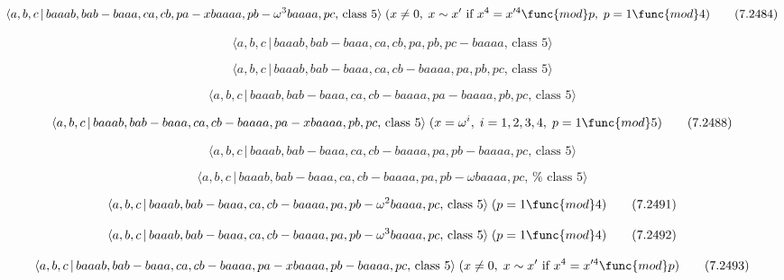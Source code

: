 \documentclass[10pt]{article}
\begin{document}
\begin{equation}
\langle a,b,c\,|\,baaab,bab-baaa,ca,cb,pa-xbaaaa,pb-\omega ^{3}baaaa,pc,\,%
\text{class }5\rangle \;(x\neq 0,\;x\sim x^{\prime }\text{ if }%
x^{4}=x^{\prime 4}\func{mod}p,\;p=1\func{mod}4)  \tag{7.2484}
\end{equation}

\begin{equation}
\langle a,b,c\,|\,baaab,bab-baaa,ca,cb,pa,pb,pc-baaaa,\,\text{class }5\rangle
\tag{7.2485}
\end{equation}

\begin{equation}
\langle a,b,c\,|\,baaab,bab-baaa,ca,cb-baaaa,pa,pb,pc,\,\text{class }5\rangle
\tag{7.2486}
\end{equation}

\begin{equation}
\langle a,b,c\,|\,baaab,bab-baaa,ca,cb-baaaa,pa-baaaa,pb,pc,\,\text{class }%
5\rangle  \tag{7.2487}
\end{equation}

\begin{equation}
\langle a,b,c\,|\,baaab,bab-baaa,ca,cb-baaaa,pa-xbaaaa,pb,pc,\,\text{class }%
5\rangle \;(x=\omega ^{i},\;i=1,2,3,4,\;p=1\func{mod}5)  \tag{7.2488}
\end{equation}

\begin{equation}
\langle a,b,c\,|\,baaab,bab-baaa,ca,cb-baaaa,pa,pb-baaaa,pc,\,\text{class }%
5\rangle  \tag{7.2489}
\end{equation}

\begin{equation}
\langle a,b,c\,|\,baaab,bab-baaa,ca,cb-baaaa,pa,pb-\omega baaaa,pc,\,\text{%
class }5\rangle  \tag{7.2490}
\end{equation}

\begin{equation}
\langle a,b,c\,|\,baaab,bab-baaa,ca,cb-baaaa,pa,pb-\omega ^{2}baaaa,pc,\,%
\text{class }5\rangle \;(p=1\func{mod}4)  \tag{7.2491}
\end{equation}

\begin{equation}
\langle a,b,c\,|\,baaab,bab-baaa,ca,cb-baaaa,pa,pb-\omega ^{3}baaaa,pc,\,%
\text{class }5\rangle \;(p=1\func{mod}4)  \tag{7.2492}
\end{equation}

\begin{equation}
\langle a,b,c\,|\,baaab,bab-baaa,ca,cb-baaaa,pa-xbaaaa,pb-baaaa,pc,\,\text{%
class }5\rangle \;(x\neq 0,\;x\sim x^{\prime }\text{ if }x^{4}=x^{\prime 4}%
\func{mod}p)  \tag{7.2493}
\end{equation}
\end{document}
